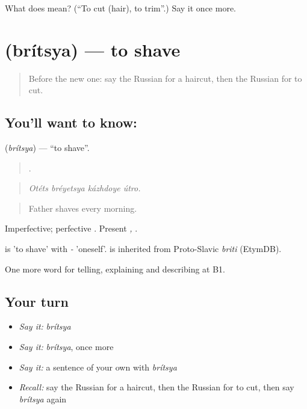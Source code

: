 \begin{tcolorbox}[breakable,colback=teal!4,colframe=teal!35!black,title={Before you move on}]
What does  mean? (\textquotedblleft{}To cut (hair), to trim\textquotedblright{}.) Say it once more.
\end{tcolorbox}
\section[\texorpdfstring{\ru{бриться} (brítsya)}{бриться (brítsya)}]{ (brítsya) — to shave}

\label{lesson:RU-C449-britsya}



\begin{quote}
Before the new one: say the Russian for a haircut, then the Russian for to cut.
\end{quote}

\subsection*{You'll want to know: }
\textbf{} (\emph{brítsya}) — \textquotedblleft{}to shave\textquotedblright{}.

\begin{quote}
   .
\end{quote}

\begin{quote}
\emph{Otéts bréyetsya kázhdoye útro.}
\end{quote}

\begin{quote}
Father shaves every morning.
\end{quote}

Imperfective; perfective \emph{}. Present \emph{, }.

\begin{cousinweb}
\emph{} is \emph{} 'to shave' with \emph{-} 'oneself'. \emph{} is inherited from Proto-Slavic \emph{briti} (EtymDB).
\end{cousinweb}

\begin{grammarlens}[title={What you've built}]
One more word for telling, explaining and describing at B1.
\end{grammarlens}

\subsection*{Your turn}
\begin{itemize}
\raggedright
  \item \emph{Say it:} \emph{brítsya}
  \item \emph{Say it:} \emph{brítsya}, once more
  \item \emph{Say it:} a sentence of your own with \emph{brítsya}
  \item \emph{Recall:} say the Russian for a haircut, then the Russian for to cut, then say \emph{brítsya} again
\end{itemize}

